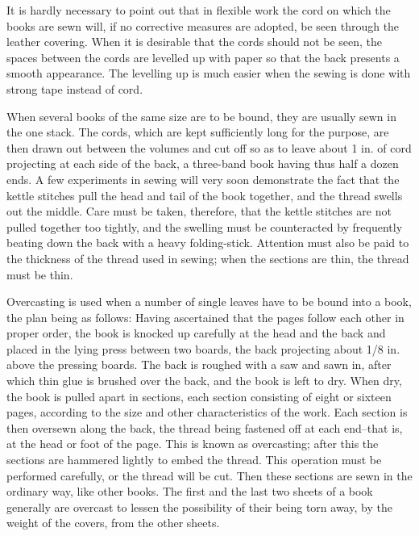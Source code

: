 \documentclass[twoside]{book}
\begin{document}
It is hardly necessary to point out that in flexible
work the cord on which the books are sewn will,
if no corrective measures are adopted, be seen
through the leather covering. When it is desirable
that the cords should not be seen, the spaces
between the cords are levelled up with paper so that
the back presents a smooth appearance. The
levelling up is much easier when the sewing is done
with strong tape instead of cord.

When several books of the same size are to be
bound, they are usually sewn in the one stack. The
cords, which are kept sufficiently long for the
purpose, are then drawn out between the volumes and
cut off so as to leave about 1 in. of cord projecting
at each side of the back, a three-band book having
thus half a dozen ends. A few experiments in sewing
\pagebreak
will very soon demonstrate the fact that the
kettle stitches pull the head and tail of the book
together, and the thread swells out the middle.
Care must be taken, therefore, that the kettle
stitches are not pulled together too tightly, and the
swelling must be counteracted by frequently beating
down the back with a heavy folding-stick.
Attention must also be paid to the thickness of the
thread used in sewing; when the sections are thin,
the thread must be thin.

Overcasting is used when a number of single
leaves have to be bound into a book, the plan being
as follows: Having ascertained that the pages follow
each other in proper order, the book is knocked up
carefully at the head and the back and placed in
the lying press between two boards, the back projecting
about 1/8 in. above the pressing boards. The
back is roughed with a saw and sawn in, after which
thin glue is brushed over the back, and the book is
left to dry. When dry, the book is pulled apart
in sections, each section consisting of eight or
sixteen pages, according to the size and other
characteristics of the work. Each section is then
oversewn along the back, the thread being fastened off
at each end--that is, at the head or foot of the page.
This is known as overcasting; after this the sections
are hammered lightly to embed the thread. This
operation must be performed carefully, or the thread
will be cut. Then these sections are sewn in the
ordinary way, like other books. The first and the
last two sheets of a book generally are overcast to
lessen the possibility of their being torn away, by
the weight of the covers, from the other sheets.

\vspace*{\fill}
\end{document}
